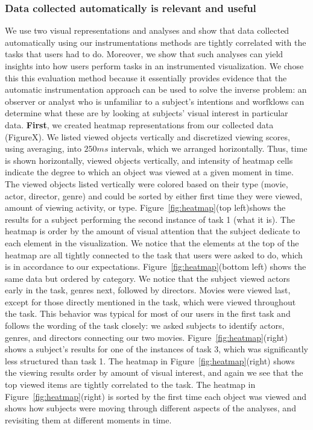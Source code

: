 \subsubsection{Data collected automatically is relevant and useful}
\label{sec:EvalDataCollected}
We use two visual representations and analyses and show that data collected automatically using our instrumentations methods are tightly correlated with the tasks that users had to do. Moreover, we show that such analyses can yield insights into how users perform tasks in an instrumented visualization. We chose this this evaluation method because it essentially provides evidence that the automatic instrumentation approach can be used to solve the inverse problem: an observer or analyst who is unfamiliar to a subject's intentions and worfklows can determine what these are by looking at subjects' visual interest in particular data. 
\textbf{First}, we created heatmap representations from our collected data (FigureX). We listed viewed objects vertically and discretized viewing scores, using averaging, into $250ms$ intervals, which we arranged horizontally. Thus, time is shown horizontally, viewed objects vertically, and intensity of heatmap cells indicate the degree to which an object was viewed at a given moment in time. The viewed objects listed vertically were colored based on their type (movie, actor, director, genre) and could be sorted by either first time they were viewed, amount of viewing activity, or type. 
Figure~\ref{fig:heatmap}(top left)shows the results for a subject performing the second instance of task 1 (what it is). The heatmap is order by the amount of visual attention that the subject dedicate to each element in the visualization. We notice that the elements at the top of the heatmap are all tightly connected to the task that users were asked to do, which is in accordance to our expectations. Figure~\ref{fig:heatmap}(bottom left) shows the same data but ordered by category. We notice that the subject viewed actors early in the task, genres next, followed by directors. Movies were viewed last, except for those directly mentioned in the task, which were viewed throughout the task. This behavior was typical for most of our users in the first task and follows the wording of the task closely: we asked subjects to identify actors, genres, and directors connecting our two movies. 
Figure~\ref{fig:heatmap}(right) shows a subject’s results for one of the instances of task 3, which was significantly less structured than task 1. The heatmap in Figure~\ref{fig:heatmap}(right) shows the viewing results order by amount of visual interest, and again we see that the top viewed items are tightly correlated to the task. The heatmap in Figure~\ref{fig:heatmap}(right) is sorted by the first time each object was viewed and shows how subjects were moving through different aspects of the analyses, and revisiting them at different moments in time. 
